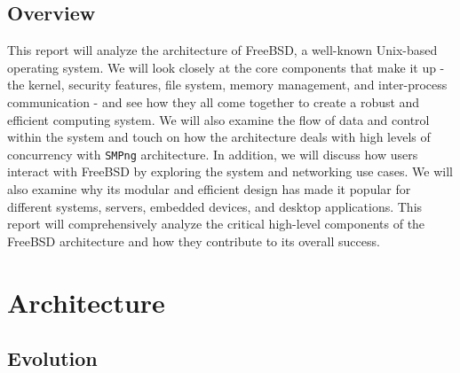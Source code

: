 \documentclass[12pt, dvipsnames, a4paper]{article}
\newcommand{\code}[1]{\texttt{#1}}
\begin{document}
\subsection{Overview}
This report will analyze the architecture of FreeBSD, a well-known Unix-based operating system. We will look closely at the core components that make it up - the kernel, security features, file system, memory management, and inter-process communication - and see how they all come together to create a robust and efficient computing system. We will also examine the flow of data and control within the system and touch on how the architecture deals with high levels of concurrency with \code{SMPng} architecture. In addition, we will discuss how users interact with FreeBSD by exploring the system and networking use cases. We will also examine why its modular and efficient design has made it popular for different systems, servers, embedded devices, and desktop applications. This report will comprehensively analyze the critical high-level components of the FreeBSD architecture and how they contribute to its overall success.
\clearpage

\section{Architecture}
\subsection{Evolution}
\end{document}
